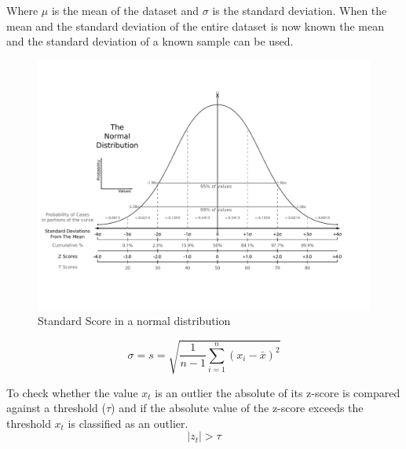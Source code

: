 Where $\mu$ is the mean of the dataset and $\sigma$ is the standard deviation. When the mean and the standard deviation of the entire dataset is now known the mean and the standard deviation of a known sample can be used.
\cite{DetectionSpatialOutlier, teschlSpezielleStetigeVerteilungen2014, rousseeuwAnomalyDetectionRobust2018}
\begin{figure}[H]
  \centering
  \includegraphics[width=\textwidth]{./pics/The_Normal_Distribution.pdf}
  \caption{Standard Score in a normal distribution\cite{StandardScore2022}}
  \label{figure:normal-distribution}
\end{figure}
\begin{equation*}
  \sigma = s = \sqrt{\frac{1}{n-1}\sum^n_{i=1}{(x_i - \bar{x})^2}}
\end{equation*}
\cite{teschlSpezielleStetigeVerteilungen2014, rousseeuwAnomalyDetectionRobust2018}
\par
To check whether the value $x_t$ is an outlier the absolute of its z-score is compared against a threshold ($\tau$) and if the absolute value of the z-score exceeds the threshold $x_t$ is classified as an outlier.
\begin{equation*}
  |z_t| > \tau
\end{equation*}
